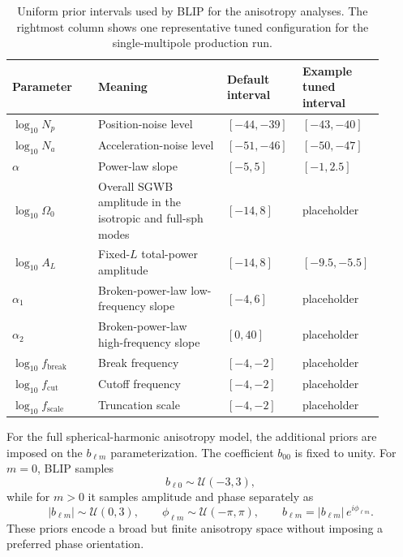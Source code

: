 \documentclass[11pt]{article}
\begin{document}
\begin{table}[H]
\centering
\caption{Uniform prior intervals used by BLIP for the anisotropy analyses. The rightmost column shows one representative tuned configuration for the single-multipole production run.}
\label{tab:priors}
\begin{tabular}{>{\raggedright\arraybackslash}p{0.22\linewidth} >{\raggedright\arraybackslash}p{0.33\linewidth} >{\raggedright\arraybackslash}p{0.18\linewidth} >{\raggedright\arraybackslash}p{0.18\linewidth}}
\toprule
Parameter & Meaning & Default interval & Example tuned interval \\
\midrule
$\log_{10}N_p$ & Position-noise level & $[-44,-39]$ & $[-43,-40]$ \\
$\log_{10}N_a$ & Acceleration-noise level & $[-51,-46]$ & $[-50,-47]$ \\
$\alpha$ & Power-law slope & $[-5,5]$ & $[-1,2.5]$ \\
$\log_{10}\Omega_0$ & Overall SGWB amplitude in the isotropic and full-sph modes & $[-14,8]$ & placeholder \\
$\log_{10}A_L$ & Fixed-$L$ total-power amplitude & $[-14,8]$ & $[-9.5,-5.5]$ \\
$\alpha_1$ & Broken-power-law low-frequency slope & $[-4,6]$ & placeholder \\
$\alpha_2$ & Broken-power-law high-frequency slope & $[0,40]$ & placeholder \\
$\log_{10}f_{\mathrm{break}}$ & Break frequency & $[-4,-2]$ & placeholder \\
$\log_{10}f_{\mathrm{cut}}$ & Cutoff frequency & $[-4,-2]$ & placeholder \\
$\log_{10}f_{\mathrm{scale}}$ & Truncation scale & $[-4,-2]$ & placeholder \\
\bottomrule
\end{tabular}
\end{table}

For the full spherical-harmonic anisotropy model, the additional priors are imposed on the $b_{\ell m}$ parameterization. The coefficient $b_{00}$ is fixed to unity. For $m=0$, BLIP samples
\begin{equation}
b_{\ell 0}\sim\mathcal{U}(-3,3),
\end{equation}
while for $m>0$ it samples amplitude and phase separately as
\begin{equation}
|b_{\ell m}|\sim\mathcal{U}(0,3),
\qquad
\phi_{\ell m}\sim\mathcal{U}(-\pi,\pi),
\qquad
b_{\ell m}=|b_{\ell m}|\,e^{i\phi_{\ell m}}.
\end{equation}
These priors encode a broad but finite anisotropy space without imposing a preferred phase orientation.
\end{document}
